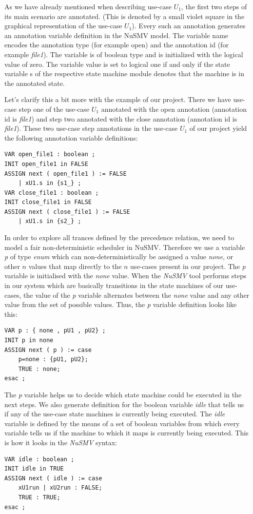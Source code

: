 As we have already mentioned when describing use-case $U_1$, the first two steps of its main scenario are annotated.
(This is denoted by a small violet square in the graphical representation of the use-case $U_1$). Every such an annotation generates an annotation variable definition in the NuSMV model.
The variable name encodes the annotation type (for example open) and the annotation id (for example \emph{file1}). The variable is of boolean type and is initialized with the logical value of zero. The variable value is set to logical one if and only if the state variable s of the respective state machine module denotes that the machine is in the annotated state.

Let's clarify this a bit more with the example of our project.
There we have use-case step one of the use-case $U_1$ annotated with the open annotation (annotation id is \emph{file1}) and step two annotated with the close annotation (annotation id is \emph{file1}). These two use-case step annotations in the use-case $U_1$ of our project yield the following annotation variable definitions:

\begin{lstlisting}
VAR open_file1 : boolean ;
INIT open_file1 in FALSE
ASSIGN next ( open_file1 ) := FALSE
	| xU1.s in {s1_} ;
VAR close_file1 : boolean ;
INIT close_file1 in FALSE
ASSIGN next ( close_file1 ) := FALSE
	| xU1.s in {s2_} ;
\end{lstlisting}

In order to explore all trances defined by the precedence relation, we need to model a fair non-deterministic scheduler in NuSMV. Therefore we use a variable \emph{p} of type \emph{enum} which can non-deterministically be assigned a value \emph{none}, or other $n$ values that map directly to the $n$ use-cases present in our project.
The \emph{p} variable is initialised with the \emph{none} value.
When the \emph{NuSMV} tool performs steps in our system which are basically transitions in the state machines of our use-cases, the value of the \emph{p} variable alternates between the \emph{none} value and any other value from the set of possible values.
Thus, the \emph{p} variable definition looks like this:
\begin{lstlisting}
VAR p : { none , pU1 , pU2} ;
INIT p in none
ASSIGN next ( p ) := case
	p=none : {pU1, pU2};
	TRUE : none;
esac ;
\end{lstlisting}

The \emph{p} variable helps us to decide which state machine could be executed in the next steps. 
We also generate definition for the boolean variable \emph{idle} that tells us if any of the use-case state machines is currently being executed.
The \emph{idle} variable is defined by the means of a set of boolean variables from which every variable tells us if the machine to which it maps is currently being executed.
This is how it looks in the \emph{NuSMV} syntax:
\begin{lstlisting}
VAR idle : boolean ;
INIT idle in TRUE
ASSIGN next ( idle ) := case
	xU1run | xU2run : FALSE;
	TRUE : TRUE;
esac ;
\end{lstlisting}

